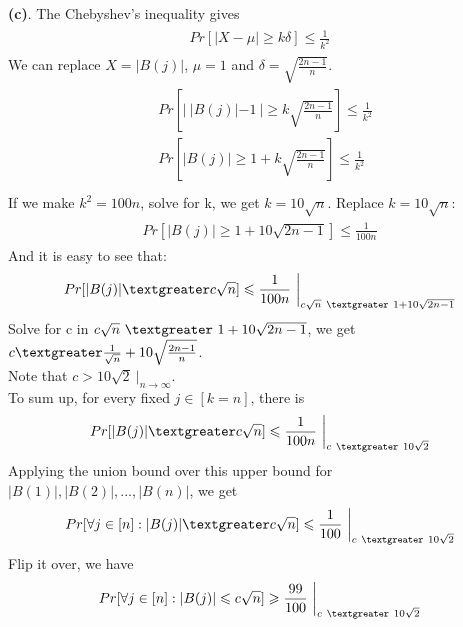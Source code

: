 \documentclass[titlepage, paper=a4, fontsize=11pt]{scrartcl} %
\numberwithin{equation}{section} %
\numberwithin{figure}{section} %
\numberwithin{table}{section} %
\begin{document}
\textbf{(c)}. The Chebyshev's inequality gives
\begin{align*} 
\begin{split}
Pr[|X-\mu| \geqslant k\delta] \leqslant \frac{1}{k^2}
\end{split}					
\end{align*}
We can replace $X = |B(j)|$, $\mu = 1$ and $\delta = \sqrt{\frac{2n-1}{n}}$.
\begin{align*} 
\begin{split}
&Pr[|\ |B(j)|-1\ | \geqslant k\sqrt{\frac{2n-1}{n}}] \leqslant \frac{1}{k^2} \\
&Pr[|B(j)| \geqslant 1+k\sqrt{\frac{2n-1}{n}}] \leqslant \frac{1}{k^2} \\
\end{split}					
\end{align*}
If we make $k^2 = 100n$, solve for k, we get $k = 10\sqrt{n}$.
Replace $k = 10\sqrt{n}$:
\begin{align*} 
\begin{split}
Pr[|B(j)| \geqslant 1+10\sqrt{2n-1}] \leqslant \frac{1}{100n}
\end{split}					
\end{align*}
And it is easy to see that:
\begin{align*} 
\begin{split}
Pr[|B(j)| \textgreater c\sqrt{n}] \leqslant \frac{1}{100n} \ \bigg|_{c\sqrt{n} \ \textgreater \ 1+10\sqrt{2n-1}}
\end{split}					
\end{align*}
Solve for c in $c\sqrt{n} \ \textgreater \ 1+10\sqrt{2n-1}$, we get $c \textgreater \frac{1}{\sqrt{n}} + 10\sqrt{\frac{2n-1}{n}}$. \\
Note that $c > 10\sqrt{2} \ \bigg|_{n \to \infty}$. \\
To sum up, for every fixed $j \in [k=n]$, there is
\begin{align*} 
\begin{split}
Pr[|B(j)| \textgreater c\sqrt{n}] \leqslant \frac{1}{100n} \ \bigg|_{c \ \textgreater \ 10\sqrt{2}}
\end{split}					
\end{align*}
Applying the union bound over this upper bound for $|B(1)|, |B(2)|, ..., |B(n)|$, we get
\begin{align*} 
\begin{split}
Pr[\forall j \in [n]: |B(j)| \textgreater c\sqrt{n}] \leqslant \frac{1}{100} \ \bigg|_{c \ \textgreater \ 10\sqrt{2}}
\end{split}					
\end{align*}
Flip it over, we have
\begin{align*} 
\begin{split}
Pr[\forall j \in [n]: |B(j)| \leqslant c\sqrt{n}] \geqslant \frac{99}{100} \ \bigg|_{c \ \textgreater \ 10\sqrt{2}}
\end{split}					
\end{align*}
\\
\end{document}
